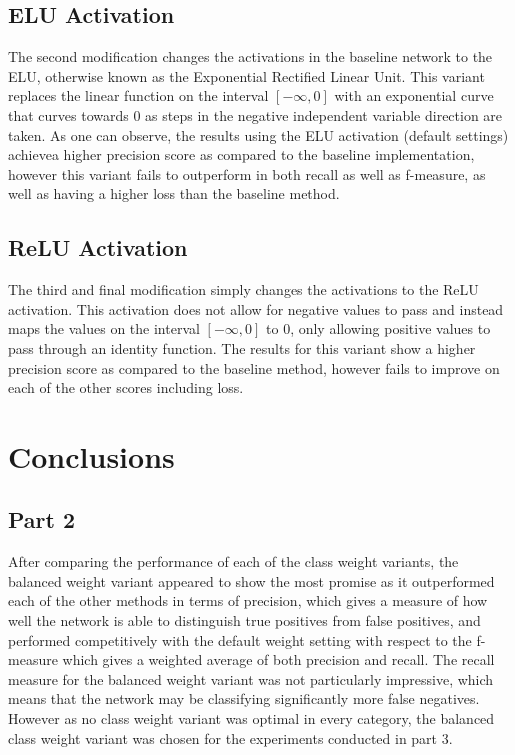 \documentclass{article}
\begin{document}
\subsection*{ELU Activation}
The second modification changes the activations in the baseline network to the ELU, otherwise known as the Exponential Rectified Linear Unit. This variant replaces the linear function on the interval $[-\infty,0]$ with an exponential curve that curves towards 0 as steps in the negative independent variable direction are taken. As one can observe, the results using the ELU activation (default settings) achievea higher precision score as compared to the baseline implementation, however this variant fails to outperform in both recall as well as f-measure, as well as having a higher loss than the baseline method.
		

\subsection*{ReLU Activation}
The third and final modification simply changes the activations to the ReLU activation. This activation does not allow for negative values to pass and instead maps the values on the interval $[-\infty,0]$ to 0, only allowing positive values to pass through an identity function. The results for this variant show a higher precision score as compared to the baseline method, however fails to improve on each of the other scores including loss. 
		


\section*{Conclusions}
\subsection*{Part 2}
After comparing the performance of each of the class weight variants, the balanced weight variant appeared to show the most promise as it outperformed each of the other methods in terms of precision, which gives a measure of how well the network is able to distinguish true positives from false positives, and performed competitively with the default weight setting with respect to the f-measure which gives a weighted average of both precision and recall. The recall measure for the balanced weight variant was not particularly impressive, which means that the network may be classifying significantly more false negatives. However as no class weight variant was optimal in every category, the balanced class weight variant was chosen for the experiments conducted in part 3.
\end{document}

